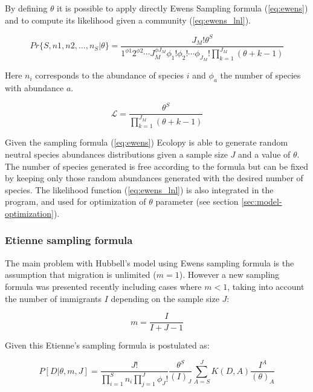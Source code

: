 By defining $\theta$ it is possible to apply directly Ewens Sampling formula (\ref{eq:ewens}) and to compute its likelihood given a community (\ref{eq:ewens_lnl}).

\begin{equation} \label{eq:ewens}
Pr\{S,n1,n2,\ldots,n_S|\theta\} = \frac{J_M!\theta^S}{1^{\phi1} 2^{\phi2} \cdots J_M^{\phi J_M} \phi_1! \phi_2! \cdots \phi_{J_M}! \prod_{k=1}^{J_M} (\theta + k - 1)}
\end{equation}

Here $n_i$ corresponds to the abundance of species $i$ and $\phi_a$ the number of species with abundance $a$.

\begin{equation} \label{eq:ewens_lnl}
\mathcal{L} = \frac{\theta^S}{\prod_{k=1}^{J_M} (\theta + k - 1)}
\end{equation}

Given the sampling formula (\ref{eq:ewens}) Ecolopy is able to generate random neutral species abundances distributions given a sample size $J$ and a value of $\theta$. The number of species generated is free according to the formula but can be fixed by keeping only those random abundances generated with the desired number of species. The likelihood function (\ref{eq:ewens_lnl}) is also integrated in the program, and used for optimization of $\theta$ parameter (see section \ref{sec:model-optimization}).

\subsubsection{Etienne sampling formula}
\label{sec:etienne-model}

The main problem with Hubbell's model using Ewens sampling formula is the assumption that migration is unlimited ($m=1$). However a new sampling formula was presented recently \cite{Etienne2005} including cases where $m<1$, taking into account the number of immigrants $I$ depending on the sample size $J$:

\begin{equation} \label{eq:m}
m = \frac{I}{I+J-1}
\end{equation}

Given this Etienne's sampling formula is postulated as:

\begin{equation} \label{eq:etienne}
P[D|\theta,m,J] = \frac{J!}{\prod_{i=1}^Sn_i \prod_{j=1}^J\phi_J!} \frac{\theta^S}{(I)_J} \sum_{A=S}^JK(D,A) \frac{I^A}{(\theta)_A}
\end{equation}

